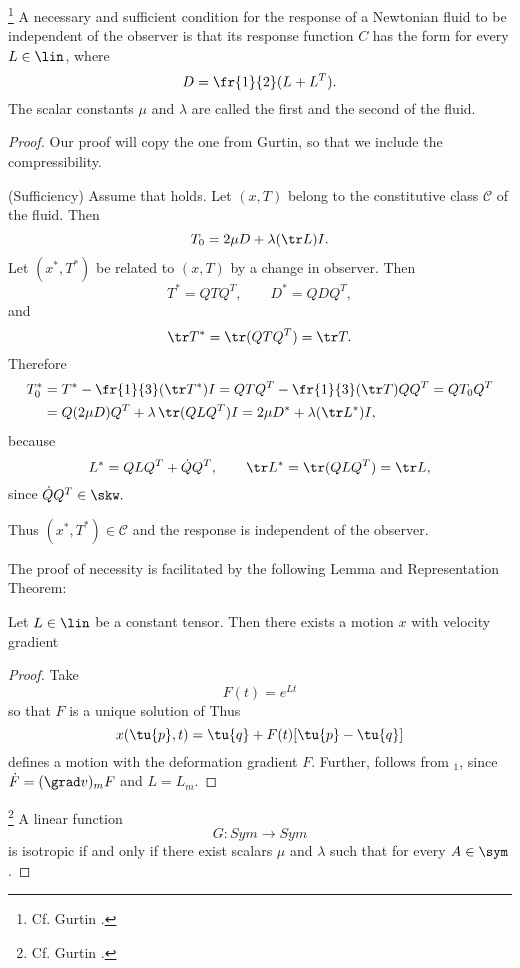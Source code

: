 \footnote{Cf. Gurtin \cite[p. 149]{gurtin}.}
A necessary and sufficient condition for the response of a Newtonian fluid to be
independent of the observer is that its response function $C$ has the form
for every $L \in \lin$, where $$D=\fr{1}{2}(L+L^T).$$
The scalar constants $\mu$ and $\lambda$ are called the first and the second 
 of the fluid.
\begin{proof}
Our proof will copy the one from Gurtin, so that we include the compressibility.

(Sufficiency) Assume that  holds. Let $(x,T)$ belong to the constitutive 
class $\mathcal C$ of the fluid. Then $$T_0=2\mu D+\lambda (\tr L)I.$$
Let $(x^*,T^*)$ be related to $(x,T)$ by a change in observer. Then
$$T^*=QTQ^T,\qquad D^*=QDQ^T,$$
and
$$\tr T^*=\tr(QTQ^T)=\tr T.$$
Therefore 
\[
\begin{split}
T^*_0&=T^*-\fr{1}{3}(\tr T^*)I=QTQ^T-\fr{1}{3}(\tr T)QQ^T=QT_0Q^T\\
&=Q(2\mu D)Q^T + \lambda\,\tr(QLQ^T)I = 2\mu D^* + \lambda(\tr L^*)I,
\end{split}
\]
because $$L^*=QLQ^T+\dot{Q}Q^T,\qquad \tr L^*=\tr(QLQ^T)=\tr L,$$
since $\dot{Q}Q^T \in \skw.$

Thus $(x^*,T^*)\in \mathcal C$ and the response is independent of the observer.

The proof of necessity is facilitated by the following Lemma and Representation Theorem:

 Let $L \in \lin$ be a constant tensor. 
Then there exists a motion $x$ with velocity gradient 
\begin{proof}
Take $$F(t)=e^{Lt}$$
so that $F$ is a unique solution of
Thus
$$x(\tu{p},t)=\tu{q}+F(t)[\tu{p}-\tu{q}]$$
defines a motion with the deformation gradient $F$. Further, 
follows from $_1$, since $\dot F=(\grad v)_mF$ and $L=L_m$.
\end{proof}

\footnote{Cf. Gurtin \cite[p. 235]{gurtin}.} 
A linear function
$$  G:Sym \rightarrow Sym $$
is isotropic if and only if there exist scalars $\mu$ and $\lambda$ such that
for every $A \in \sym$.


\end{proof}
